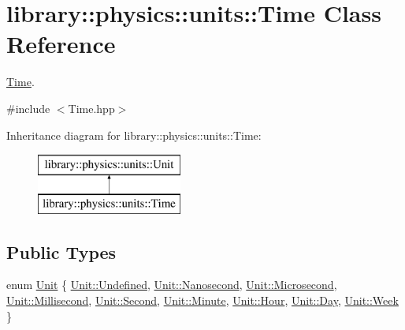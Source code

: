 \hypertarget{classlibrary_1_1physics_1_1units_1_1_time}{}\section{library\+:\+:physics\+:\+:units\+:\+:Time Class Reference}
\label{classlibrary_1_1physics_1_1units_1_1_time}


\hyperlink{classlibrary_1_1physics_1_1units_1_1_time}{Time}.  




{\ttfamily \#include $<$Time.\+hpp$>$}

Inheritance diagram for library\+:\+:physics\+:\+:units\+:\+:Time\+:\begin{figure}[H]
\begin{center}
\leavevmode
\includegraphics[height=2.000000cm]{classlibrary_1_1physics_1_1units_1_1_time}
\end{center}
\end{figure}
\subsection*{Public Types}
\begin{DoxyCompactItemize}
\item 
enum \hyperlink{classlibrary_1_1physics_1_1units_1_1_time_ab876a6a05c9a2f28905f2753bfd64109}{Unit} \{ \newline
\hyperlink{classlibrary_1_1physics_1_1units_1_1_time_ab876a6a05c9a2f28905f2753bfd64109aec0fc0100c4fc1ce4eea230c3dc10360}{Unit\+::\+Undefined}, 
\hyperlink{classlibrary_1_1physics_1_1units_1_1_time_ab876a6a05c9a2f28905f2753bfd64109a4146c294bcc82b1723c65bdc64b55089}{Unit\+::\+Nanosecond}, 
\hyperlink{classlibrary_1_1physics_1_1units_1_1_time_ab876a6a05c9a2f28905f2753bfd64109a1f14b3811ca5de688daa740d8471249e}{Unit\+::\+Microsecond}, 
\hyperlink{classlibrary_1_1physics_1_1units_1_1_time_ab876a6a05c9a2f28905f2753bfd64109a988bbeeb80e7e0a6b4651aab5a76b413}{Unit\+::\+Millisecond}, 
\newline
\hyperlink{classlibrary_1_1physics_1_1units_1_1_time_ab876a6a05c9a2f28905f2753bfd64109ac22cf8376b1893dcfcef0649fe1a7d87}{Unit\+::\+Second}, 
\hyperlink{classlibrary_1_1physics_1_1units_1_1_time_ab876a6a05c9a2f28905f2753bfd64109a62902641c38f3a4a8eb3212454360e24}{Unit\+::\+Minute}, 
\hyperlink{classlibrary_1_1physics_1_1units_1_1_time_ab876a6a05c9a2f28905f2753bfd64109ab55e509c697e4cca0e1d160a7806698f}{Unit\+::\+Hour}, 
\hyperlink{classlibrary_1_1physics_1_1units_1_1_time_ab876a6a05c9a2f28905f2753bfd64109a03727ac48595a24daed975559c944a44}{Unit\+::\+Day}, 
\newline
\hyperlink{classlibrary_1_1physics_1_1units_1_1_time_ab876a6a05c9a2f28905f2753bfd64109ad2ce009594dcc60befa6a4e6cbeb71fc}{Unit\+::\+Week}
 \}
\end{DoxyCompactItemize}
